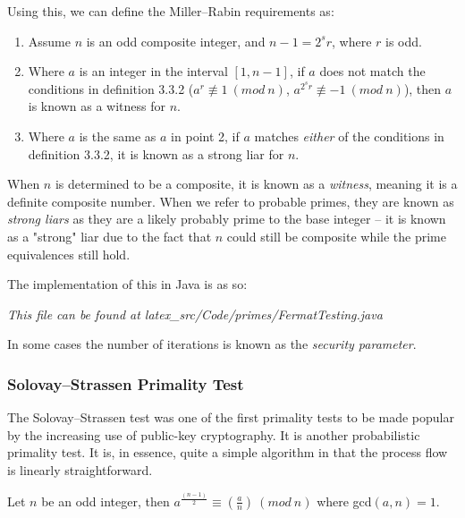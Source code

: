     Using this, we can define the Miller--Rabin requirements as:
    
    \begin{enumerate}
      \item Assume $n$ is an odd composite integer, and $n - 1 = 2^sr$, where $r$ is odd.
      \item Where $a$ is an integer in the interval $[1,n-1]$, if $a$ does not match the conditions in definition 3.3.2 ($a^r \not\equiv1 \ (mod \ n)$,  $a^{2^sr} \not\equiv -1 \ (mod \ n)$), then $a$ is known as a witness for $n$.
      \item Where $a$ is the same as $a$ in point 2, if $a$ matches \emph{either} of the conditions in definition 3.3.2, it is known as a strong liar for $n$.
    \end{enumerate}
    
    When $n$ is determined to be a composite, it is known as a \emph{witness}, meaning it is a definite composite number. When we refer to probable primes, they are known as \emph{strong liars} as they are a likely probably prime to the base integer -- it is known as a "strong" liar due to the fact that $n$ could still be composite while the prime equivalences still hold.
    
    The implementation of this in Java is as so:
    
    
    \emph{This file can be found at latex\_src/Code/primes/FermatTesting.java}
    
    In some cases the number of iterations is known as the \emph{security parameter}.
    
    \subsubsection{Solovay--Strassen Primality Test}
    
    The Solovay--Strassen test was one of the first primality tests to be made popular by the increasing use of public-key cryptography. It is another probabilistic primality test. It is, in essence, quite a simple algorithm in that the process flow is linearly straightforward. \\
    
    \begin{mathdef}
      Let $n$ be an odd integer, then $a^{\frac{(n-1)}{2}} \equiv (\frac{a}{n}) \ (mod \ n)$ where gcd$(a,n) = 1$.
    \end{mathdef}
    
